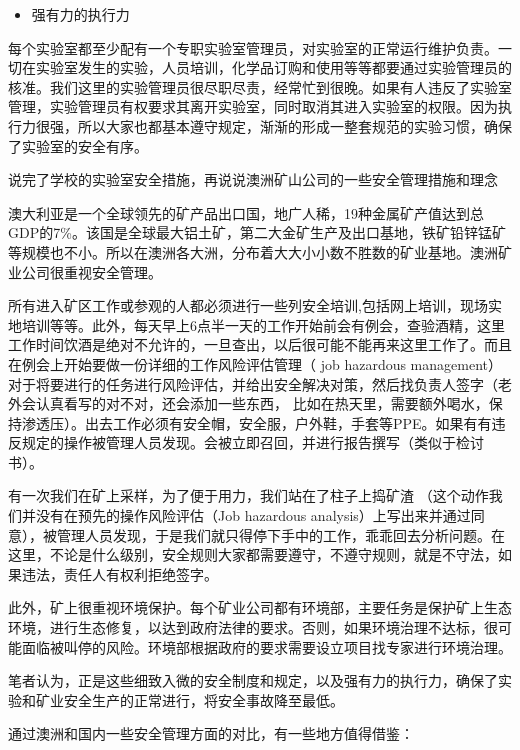 \documentclass[]{book}
\providecommand{\tightlist}{%
  \setlength{\itemsep}{0pt}\setlength{\parskip}{0pt}}
\begin{document}
\begin{itemize}
\tightlist
\item
  强有力的执行力
\end{itemize}

每个实验室都至少配有一个专职实验室管理员，对实验室的正常运行维护负责。一切在实验室发生的实验，人员培训，化学品订购和使用等等都要通过实验管理员的核准。我们这里的实验管理员很尽职尽责，经常忙到很晚。如果有人违反了实验室管理，实验管理员有权要求其离开实验室，同时取消其进入实验室的权限。因为执行力很强，所以大家也都基本遵守规定，渐渐的形成一整套规范的实验习惯，确保了实验室的安全有序。

说完了学校的实验室安全措施，再说说澳洲矿山公司的一些安全管理措施和理念

澳大利亚是一个全球领先的矿产品出口国，地广人稀，19种金属矿产值达到总GDP的7\%。该国是全球最大铝土矿，第二大金矿生产及出口基地，铁矿铅锌锰矿等规模也不小。所以在澳洲各大洲，分布着大大小小数不胜数的矿业基地。澳洲矿业公司很重视安全管理。

所有进入矿区工作或参观的人都必须进行一些列安全培训,包括网上培训，现场实地培训等等。此外，每天早上6点半一天的工作开始前会有例会，查验酒精，这里工作时间饮酒是绝对不允许的，一旦查出，以后很可能不能再来这里工作了。而且在例会上开始要做一份详细的工作风险评估管理（ job hazardous management）对于将要进行的任务进行风险评估，并给出安全解决对策，然后找负责人签字（老外会认真看写的对不对，还会添加一些东西， 比如在热天里，需要额外喝水，保持渗透压）。出去工作必须有安全帽，安全服，户外鞋，手套等PPE。如果有有违反规定的操作被管理人员发现。会被立即召回，并进行报告撰写（类似于检讨书）。

有一次我们在矿上采样，为了便于用力，我们站在了柱子上捣矿渣 （这个动作我们并没有在预先的操作风险评估（Job hazardous analysis）上写出来并通过同意），被管理人员发现，于是我们就只得停下手中的工作，乖乖回去分析问题。在这里，不论是什么级别，安全规则大家都需要遵守，不遵守规则，就是不守法，如果违法，责任人有权利拒绝签字。

此外，矿上很重视环境保护。每个矿业公司都有环境部，主要任务是保护矿上生态环境，进行生态修复，以达到政府法律的要求。否则，如果环境治理不达标，很可能面临被叫停的风险。环境部根据政府的要求需要设立项目找专家进行环境治理。

笔者认为，正是这些细致入微的安全制度和规定，以及强有力的执行力，确保了实验和矿业安全生产的正常进行，将安全事故降至最低。

通过澳洲和国内一些安全管理方面的对比，有一些地方值得借鉴：
\end{document}

